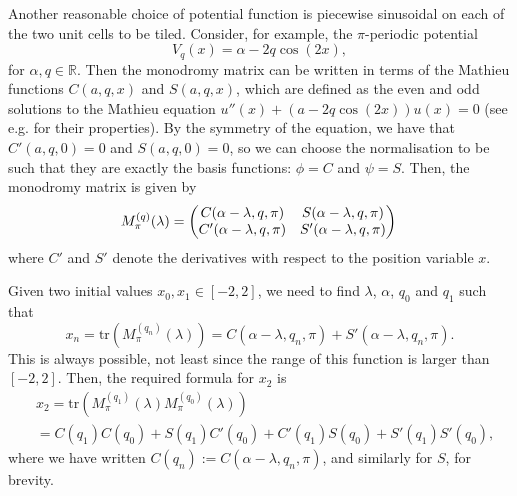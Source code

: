 \documentclass[nofootinbib,prb,amsmath,amssymb,twocolumn,floatfix]{revtex4-2}
\theoremstyle{definition}
\newcommand{\tr}{\mathrm{tr}}
\begin{document}
Another reasonable choice of potential function is piecewise sinusoidal on each of the two unit cells to be tiled. Consider, for example, the $\pi$-periodic potential
\begin{equation}
	V_q(x)=\alpha-2q\cos(2x),
\end{equation}
for $\alpha, q\in\mathbb{R}$. Then the monodromy matrix can be written in terms of the Mathieu functions $C(a,q,x)$ and $S(a,q,x)$, which are defined as the even and odd solutions to the Mathieu equation $u''(x)+(a-2q\cos(2x))u(x)=0$ (see e.g.
\cite{abramowitz1948handbook} for their properties). By the symmetry of the equation, we have that $C'(a,q,0)=0$ and $S(a,q,0)=0$, so we can choose the normalisation to be such that they are exactly the basis functions: $\phi=C$ and $\psi=S$. Then, the monodromy matrix is given by
\begin{equation} \label{eq:monod_mathieu}
	M_\pi^{(q)}(\lambda)=
	\begin{pmatrix} C(\alpha-\lambda,q,\pi) & S(\alpha-\lambda,q,\pi) \\ C'(\alpha-\lambda,q,\pi) & S'(\alpha-\lambda,q,\pi) \end{pmatrix} \\
\end{equation}
where $C'$ and $S'$ denote the derivatives with respect to the position variable $x$. %


Given two initial values $x_0,x_1\in[-2,2]$, we need to find $\lambda$, $\alpha$, $q_0$ and $q_1$ such that
\begin{equation*}
	x_n=\tr\left( M_\pi^{(q_n)}(\lambda) \right)
	=C(\alpha{-}\lambda,q_n,\pi)+S'(\alpha{-}\lambda,q_n,\pi).
\end{equation*}
This is always possible, not least since the range of this function is larger than $[-2,2]$. Then, the required formula for $x_2$ is
\begin{align}
	&x_2=\tr\left(  M_\pi^{(q_1)}(\lambda) M_\pi^{(q_0)}(\lambda) \right) \\
	&= C(q_1)C(q_0){+}S(q_1)C'(q_0){+}C'(q_1)S(q_0)  {+}S'(q_1)S'(q_0), \nonumber
\end{align}
where we have written $C(q_n):=C(\alpha-\lambda,q_n,\pi)$, and similarly for $S$, for brevity.
\end{document}
